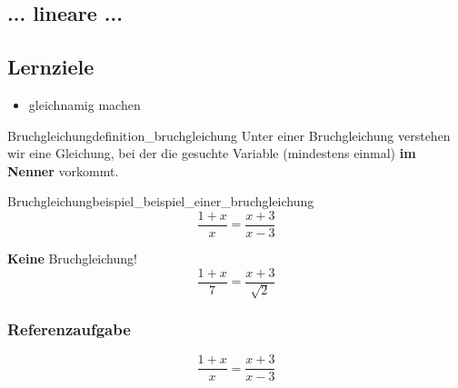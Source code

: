 
\subsection{... lineare ...}






\subsection*{Lernziele}

\begin{itemize}
	\item gleichnamig machen
\end{itemize}

\begin{definition}{Bruchgleichung}{definition_bruchgleichung}
  Unter einer Bruchgleichung verstehen wir eine Gleichung, bei der die
  gesuchte Variable (mindestens einmal) \textbf{im Nenner} vorkommt.
\end{definition}

\begin{beispiel}{Bruchgleichung}{beispiel_beispiel_einer_bruchgleichung}
$$\frac{1+x}{x}=\frac{x+3}{x-3}$$
\end{beispiel}

\begin{bemerkung}{\textbf{Keine} Bruchgleichung!}{}
  $$\frac{1+x}7=\frac{x+3}{\sqrt{2}}$$
  \end{bemerkung}
\newpage
\subsubsection{Referenzaufgabe}

$$\frac{1+x}{x}=\frac{x+3}{x-3}$$
  
